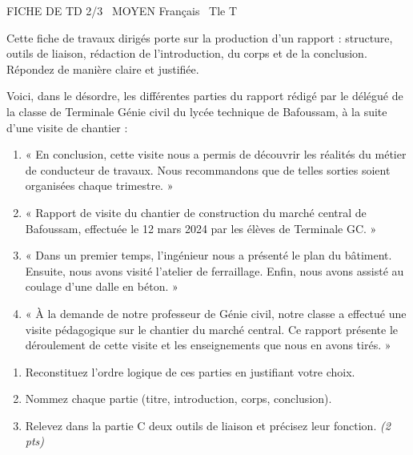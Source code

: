 \documentclass[11pt]{article}
\begin{document}
\begin{tcolorbox}[enhanced,colback=popink,colframe=popink,arc=10pt,boxrule=0pt,left=12pt,right=12pt,top=9pt,bottom=9pt]
{\color{white}\popxbold\small FICHE DE TD 2/3 \textbullet\ MOYEN \hfill Français \textbullet\ Tle T\par}
\end{tcolorbox}
\vspace{4pt}
Cette fiche de travaux dirigés porte sur la production d'un rapport : structure, outils de liaison, rédaction de l'introduction, du corps et de la conclusion. Répondez de manière claire et justifiée.

\begin{exercice}
Voici, dans le désordre, les différentes parties du rapport rédigé par le délégué de la classe de Terminale Génie civil du lycée technique de Bafoussam, à la suite d'une visite de chantier :

\begin{enumerate}[label=\Alph*.]
\item « En conclusion, cette visite nous a permis de découvrir les réalités du métier de conducteur de travaux. Nous recommandons que de telles sorties soient organisées chaque trimestre. »
\item « Rapport de visite du chantier de construction du marché central de Bafoussam, effectuée le 12 mars 2024 par les élèves de Terminale GC. »
\item « Dans un premier temps, l'ingénieur nous a présenté le plan du bâtiment. Ensuite, nous avons visité l'atelier de ferraillage. Enfin, nous avons assisté au coulage d'une dalle en béton. »
\item « À la demande de notre professeur de Génie civil, notre classe a effectué une visite pédagogique sur le chantier du marché central. Ce rapport présente le déroulement de cette visite et les enseignements que nous en avons tirés. »
\end{enumerate}

\begin{enumerate}
\item Reconstituez l'ordre logique de ces parties en justifiant votre choix.
\item Nommez chaque partie (titre, introduction, corps, conclusion).
\item Relevez dans la partie C deux outils de liaison et précisez leur fonction. \textit{(2 pts)}
\end{enumerate}
\end{exercice}
\end{document}

